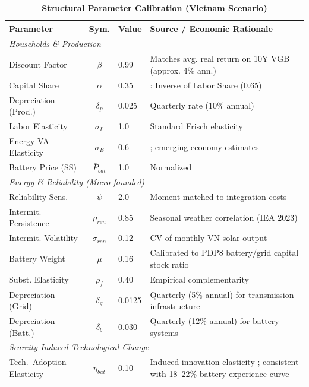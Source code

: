 \documentclass[12pt, a4paper]{article}
\begin{document}
\begin{table}[H]
    \centering
    \caption{\textbf{Structural Parameter Calibration (Vietnam Scenario)}}
    \label{tab:calibration}
    \renewcommand{\arraystretch}{1.3}
    \small
    \begin{tabular}{l c l p{6.5cm}}
        \toprule
        \textbf{Parameter} & \textbf{Sym.} & \textbf{Value} & \textbf{Source / Economic Rationale} \\
        \midrule
        \multicolumn{4}{l}{\textit{Households \& Production}} \\
        Discount Factor & $\beta$ & 0.99 & Matches avg. real return on 10Y VGB (approx. 4\% ann.) \\
        Capital Share & $\alpha$ & 0.35 & \citet{gso2024}: Inverse of Labor Share (0.65) \\
        Depreciation (Prod.) & $\delta_p$ & 0.025 & Quarterly rate (10\% annual) \\
        Labor Elasticity & $\sigma_L$ & 1.0 & Standard Frisch elasticity \\
        Energy-VA Elasticity & $\sigma_E$ & 0.6 & \citet{heutel2012}; emerging economy estimates \\
        Battery Price (SS) & $\bar{P}_{bat}$ & 1.0 & Normalized \\
        \midrule
        \multicolumn{4}{l}{\textit{Energy \& Reliability (Micro-founded)}} \\
        Reliability Sens. & $\psi$ & 2.0 & Moment-matched to integration costs \citep{zakeri2015} \\
        Intermit. Persistence & $\rho_{ren}$ & 0.85 & Seasonal weather correlation (IEA 2023) \\
        Intermit. Volatility & $\sigma_{ren}$ & 0.12 & CV of monthly VN solar output \citep{gso2024,iea2023} \\
        Battery Weight & $\mu$ & 0.16 & Calibrated to PDP8 battery/grid capital stock ratio \\
        Subst. Elasticity & $\rho_f$ & 0.40 & Empirical complementarity \citep{hart2019} \\
        Depreciation (Grid) & $\delta_g$ & 0.0125 & Quarterly (5\% annual) for transmission infrastructure \\
        Depreciation (Batt.) & $\delta_b$ & 0.030 & Quarterly (12\% annual) for battery systems \\
        \midrule
        \multicolumn{4}{l}{\textit{Scarcity-Induced Technological Change}} \\
        Tech.\ Adoption Elasticity & $\eta_{bat}$ & 0.10 & Induced innovation elasticity \citep{popp2002}; consistent with 18--22\% battery experience curve \citep{kittner2017,way2022} \\

\end{tabular}
\end{table}
\end{document}
